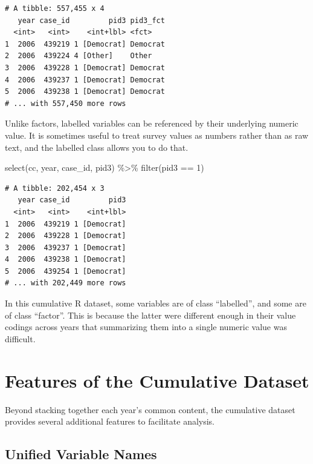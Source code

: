 \documentclass[10pt,article,oneside]{memoir}
\theoremstyle{definition}
\newenvironment{Shaded}{\begin{snugshade}}{\end{snugshade}}
\newcommand{\DecValTok}[1]{\textcolor[rgb]{0.00,0.00,0.81}{#1}}
\newcommand{\FunctionTok}[1]{\textcolor[rgb]{0.00,0.00,0.00}{#1}}
\newcommand{\NormalTok}[1]{#1}
\newcommand{\SpecialCharTok}[1]{\textcolor[rgb]{0.00,0.00,0.00}{#1}}
\begin{document}
\begin{verbatim}
# A tibble: 557,455 x 4
   year case_id         pid3 pid3_fct
  <int>   <int>    <int+lbl> <fct>   
1  2006  439219 1 [Democrat] Democrat
2  2006  439224 4 [Other]    Other   
3  2006  439228 1 [Democrat] Democrat
4  2006  439237 1 [Democrat] Democrat
5  2006  439238 1 [Democrat] Democrat
# ... with 557,450 more rows
\end{verbatim}

\noindent Unlike factors, labelled variables can be referenced by their
underlying numeric value. It is sometimes useful to treat survey values
as numbers rather than as raw text, and the labelled class allows you to
do that.

\begin{Shaded}
\begin{Highlighting}[]
\FunctionTok{select}\NormalTok{(cc, year, case\_id, pid3) }\SpecialCharTok{\%\textgreater{}\%} 
  \FunctionTok{filter}\NormalTok{(pid3 }\SpecialCharTok{==} \DecValTok{1}\NormalTok{)}
\end{Highlighting}
\end{Shaded}

\begin{verbatim}
# A tibble: 202,454 x 3
   year case_id         pid3
  <int>   <int>    <int+lbl>
1  2006  439219 1 [Democrat]
2  2006  439228 1 [Democrat]
3  2006  439237 1 [Democrat]
4  2006  439238 1 [Democrat]
5  2006  439254 1 [Democrat]
# ... with 202,449 more rows
\end{verbatim}

\indent In this cumulative R dataset, some variables are of class
``labelled'', and some are of class ``factor''. This is because the
latter were different enough in their value codings across years that
summarizing them into a single numeric value was difficult.

\newpage

\hypertarget{features-of-the-cumulative-dataset}{%
\section{Features of the Cumulative
Dataset}\label{features-of-the-cumulative-dataset}}

Beyond stacking together each year's common content, the cumulative
dataset provides several additional features to facilitate analysis.

\hypertarget{unified-variable-names}{%
\subsection{Unified Variable Names}\label{unified-variable-names}}
\end{document}
